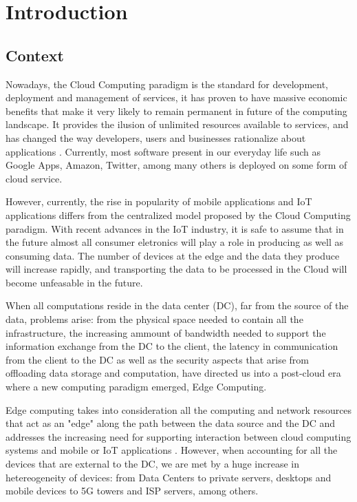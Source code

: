 \newcommand{\novathesis}{\emph{novathesis}}
\newcommand{\novathesisclass}{\texttt{novathesis.cls}}


\chapter{Introduction}
\label{cha:introduction}

\section{Context}

Nowadays, the Cloud Computing paradigm is the standard for development, deployment and management of services, 
it has proven to have massive economic benefits that make it very likely to remain permanent in future of the 
computing landscape. It provides the ilusion of unlimited resources available to services, and has changed the 
way developers, users and businesses rationalize about  applications \cite{10.1145/1721654.1721672}.
Currently, most software present in our everyday life such as Google Apps,
Amazon, Twitter, among many others is deployed on some form of cloud service. 

However, currently, the rise in popularity of mobile applications and IoT applications differs from 
the centralized model proposed by the Cloud Computing paradigm. With recent advances in the IoT
industry, it is safe to assume that in the future almost all consumer eletronics will play 
a role in producing as well as consuming data. The number of devices at the
edge and the data they produce will increase rapidly, and transporting the
data to be processed in the Cloud will become unfeasable in the future. 

When all computations reside in the data center (DC), far from the source of the data, 
problems arise: from the physical space needed to contain all the infrastructure,
the increasing ammount of bandwidth needed to support the information exchange from the DC to the client,
the latency in communication from the client to the DC as well as the
security aspects that arise from offloading data storage and computation,
have directed us into a post-cloud era where a new computing paradigm emerged, Edge Computing. 

Edge computing takes into consideration all the computing and network resources that act as an "edge" along
the path between the data source and the DC and addresses the increasing need for supporting interaction between cloud 
computing systems and mobile or IoT applications \cite{iot_journal_shi_weisong_and_cao}. However, 
when accounting for all the devices that are external to the DC, we are met by a huge increase in 
hetereogeneity of devices: from Data Centers to private servers, desktops and mobile devices to 5G towers and ISP servers, among others. 

